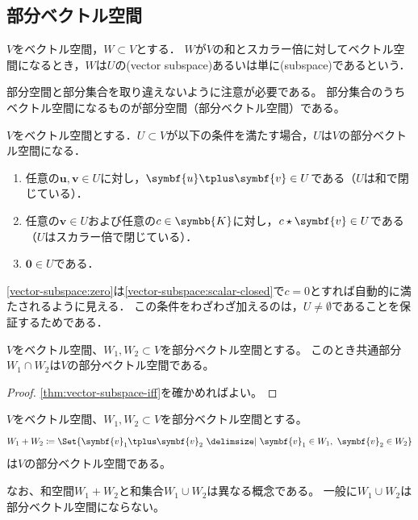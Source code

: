 \documentclass[../sotsu.tex]{subfiles}
\begin{document}
\subsection{部分ベクトル空間}

\begin{definition}[部分ベクトル空間]
    \label{dfn:vector-subspace}
    $V$をベクトル空間，$W \subset V$とする．
    $W$が$V$の和とスカラー倍に対してベクトル空間になるとき，$W$は$U$の(vector subspace)あるいは単に(subspace)であるという．
\end{definition}

部分空間と部分集合を取り違えないように注意が必要である。
部分集合のうちベクトル空間になるものが部分空間（部分ベクトル空間）である。

\begin{theorem}
    \label{thm:vector-subspace-iff}
    $V$をベクトル空間とする．$U \subset V$が以下の条件を満たす場合，$U$は$V$の部分ベクトル空間になる．
    \begin{enumerate}
        \item \label{vector-subspace:sum-closed} 任意の$\symbf{u}, \symbf{v} \in U$に対し，$\symbf{u} \vecplus \symbf{v} \in U$である（$U$は和で閉じている）．
        \item \label{vector-subspace:scalar-closed} 任意の$\symbf{v} \in U$および任意の$c \in \symbb{K}$に対し，$c \scaprod \symbf{v} \in U$である（$U$はスカラー倍で閉じている）．
        \item \label{vector-subspace:zero} $\symbf{0} \in U$である．
    \end{enumerate}
    \cref{vector-subspace:zero}は\cref{vector-subspace:scalar-closed}で$c=0$とすれば自動的に満たされるように見える．
    この条件をわざわざ加えるのは，$U \neq \emptyset$であることを保証するためである．
\end{theorem}


\begin{proposition}
    \label{thm:intersection-of-vector-space}
    $V$をベクトル空間、$W_1, W_2 \subset V$を部分ベクトル空間とする。
    このとき共通部分$W_1 \cap W_2$は$V$の部分ベクトル空間である。
\end{proposition}

\begin{proof}
    \cref{thm:vector-subspace-iff}を確かめればよい。
\end{proof}


\begin{definition}[和空間]
    \label{dfn:sum-of-vector-space}
    $V$をベクトル空間、$W_1, W_2 \subset V$を部分ベクトル空間とする。
    \begin{equation}
        W_1 + W_2 \coloneq \Set{  \symbf{v}_1 \vecplus \symbf{v}_2  \given  \symbf{v}_1 \in W_1, \  \symbf{v}_2 \in W_2  }
    \end{equation}
    は$V$の部分ベクトル空間である。
\end{definition}
なお、和空間$W_1 + W_2$と和集合$W_1 \cup W_2$は異なる概念である。
一般に$W_1 \cup W_2$は部分ベクトル空間にならない。
\end{document}
